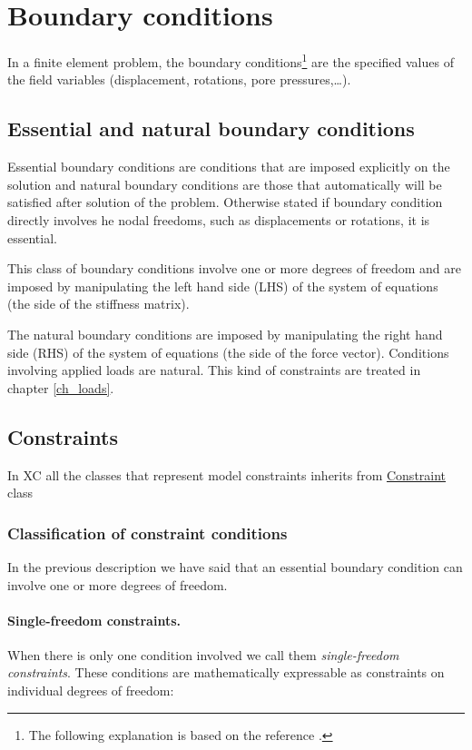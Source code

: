 \section{Boundary conditions}
In a finite element problem, the boundary conditions\footnote{The following explanation is based on the reference \cite{asen5007}.} are the specified values of the field variables (displacement, rotations, pore pressures,\ldots).

\subsection{Essential and natural boundary conditions}
Essential boundary conditions are conditions that are imposed explicitly on the solution and natural boundary conditions are those that automatically will be satisfied after solution of the problem. Otherwise stated if boundary condition directly involves he nodal freedoms, such as displacements or rotations, it is essential.

This class of boundary conditions involve one or more degrees of freedom and are imposed by manipulating the left hand side (LHS) of the system of equations (the side of the stiffness matrix).

The natural boundary conditions are imposed by manipulating the right hand side (RHS) of the system of equations (the side of the force vector). Conditions involving applied loads are natural. This kind of constraints are treated in chapter \ref{ch_loads}.

\subsection{Constraints}
In XC all the classes that represent model constraints inherits from \href{https://github.com/lcpt/xc/blob/master/src/domain/constraints/Constraint.h}{Constraint} class 

\subsubsection{Classification of constraint conditions}
In the previous  description we have said that an essential boundary condition can involve one or more degrees of freedom.

\paragraph{Single-freedom constraints.}
When there is only one condition involved we call them \emph{single-freedom constraints}. These conditions are mathematically expressable as constraints on individual degrees of freedom:

